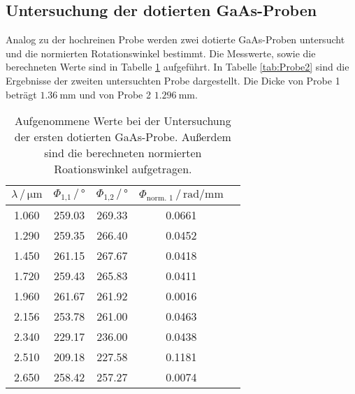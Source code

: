   \subsection{Untersuchung der dotierten GaAs-Proben}
   Analog zu der hochreinen Probe werden zwei dotierte GaAs-Proben untersucht und die normierten Rotationswinkel
   bestimmt. Die Messwerte, sowie die berechneten Werte sind in Tabelle \ref{tab:Probe1} aufgeführt.
   In Tabelle \ref{tab:Probe2} sind die Ergebnisse der zweiten untersuchten Probe dargestellt.
   Die Dicke von Probe 1 beträgt $\SI{1.36}{\milli\meter}$ und von Probe 2 $\SI{1.296}{\milli\meter}$.
   \begin{table}[H]
     \centering
     \caption{Aufgenommene Werte bei der Untersuchung der ersten dotierten GaAs-Probe. Außerdem sind die
     berechneten normierten Roationswinkel aufgetragen.}
     \label{tab:Probe1}
     \begin{tabular}{ccccc}
       \toprule
       $\lambda\, / \, \si{\micro\meter}$ & $\Phi_\text{1,1} \, / \, \si{\degree}$ & $\Phi_\text{1,2} \, / \, \si{\degree}$ & $\Phi_\text{norm. 1} \, / \, \si{\radian\per\milli\meter}$  \\
       \midrule
       \num{1.060} & \num{259.03} & \num{269.33} & \num{0.0661}  \\
       \num{1.290} & \num{259.35} & \num{266.40} & \num{0.0452}  \\
       \num{1.450} & \num{261.15} & \num{267.67} & \num{0.0418}  \\
       \num{1.720} & \num{259.43} & \num{265.83} & \num{0.0411}  \\
       \num{1.960} & \num{261.67} & \num{261.92} & \num{0.0016}  \\
       \num{2.156} & \num{253.78} & \num{261.00} & \num{0.0463}  \\
       \num{2.340} & \num{229.17} & \num{236.00} & \num{0.0438}  \\
       \num{2.510} & \num{209.18} & \num{227.58} & \num{0.1181}  \\
       \num{2.650} & \num{258.42} & \num{257.27} & \num{0.0074}  \\
       \bottomrule
     \end{tabular}
     \end{table} \noindent

